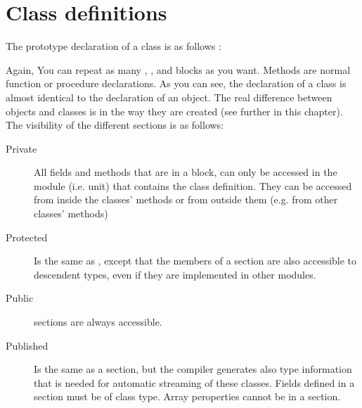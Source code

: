 \documentclass{report}
\begin{document}
\section{Class definitions}
The prototype declaration of a class is as follows :

Again, You can repeat as many , , 
and  blocks as you want.
Methods are normal function or procedure declarations.
As you can see, the declaration of a class is almost identical to the
declaration of an object. The real difference between objects and classes
is in the way they are created (see further in this chapter).
The visibility of the different sections is as follows:
\begin{description}
\item [Private\ ] All fields and methods that are in a  block, can
only be accessed in the module (i.e. unit) that contains the class definition.
They can be accessed from inside the classes' methods or from outside them
(e.g. from other classes' methods)
\item [Protected\ ] Is the same as , except that the members of
a  section are also accessible to descendent types, even if
they are implemented in other modules.
\item [Public\ ] sections are always accessible.
\item [Published\ ] Is the same as a  section, but the compiler
generates also type information that is needed for automatic streaming of
these classes. Fields defined in a  section must be of class type.
Array peroperties cannot be in a  section.
\end{description}
\end{document}
